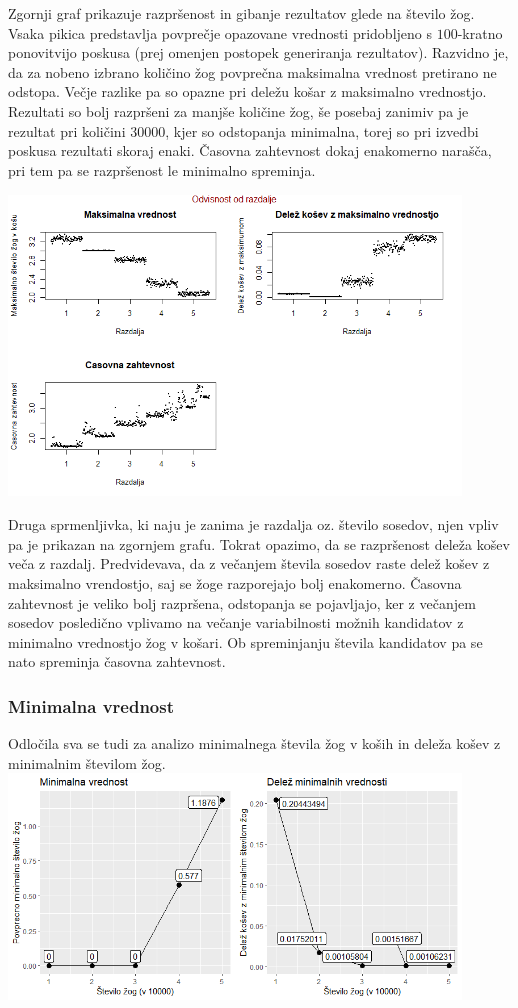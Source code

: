 \documentclass[a4paper, 11pt]{article}
\begin{document}
Zgornji graf prikazuje razpršenost in gibanje rezultatov glede na število žog. Vsaka pikica predstavlja povprečje opazovane vrednosti pridobljeno s $100$-kratno ponovitvijo poskusa (prej omenjen postopek generiranja rezultatov).
Razvidno je, da za nobeno izbrano količino žog povprečna maksimalna vrednost pretirano ne odstopa. Večje razlike pa so opazne pri deležu košar z maksimalno vrednostjo. Rezultati so bolj razpršeni za manjše količine žog, še posebaj zanimiv pa je rezultat
pri količini 30000, kjer so odstopanja minimalna, torej so pri izvedbi poskusa rezultati skoraj enaki.
Časovna zahtevnost dokaj enakomerno narašča, pri tem pa se razpršenost le minimalno spreminja.
\bigbreak


\includegraphics[width=12cm, height= 8cm]{dim1_glede_na_razdaljo1.png}

Druga sprmenljivka, ki naju je zanima je razdalja oz. število sosedov, njen vpliv pa je prikazan na zgornjem grafu.
Tokrat opazimo, da se razpršenost deleža košev veča z razdalj. Predvidevava, da z večanjem števila sosedov raste delež košev z maksimalno vrendostjo, saj se žoge razporejajo bolj enakomerno.
Časovna zahtevnost je veliko bolj razpršena, odstopanja se pojavljajo, ker z večanjem sosedov posledično vplivamo na večanje variabilnosti možnih kandidatov z minimalno vrednostjo žog v košari. Ob spreminjanju števila kandidatov pa se nato spreminja časovna zahtevnost.
\bigbreak

\subsubsection{Minimalna vrednost}
Odločila sva se tudi za analizo minimalnega števila žog v koših in deleža košev z minimalnim številom žog.
\bigbreak
\includegraphics[width=12cm, height=6cm]{minimum.png}
\end{document}
